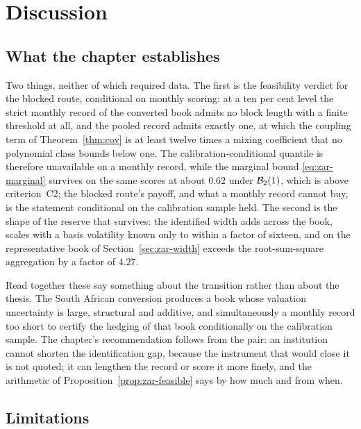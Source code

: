 \documentclass[../../../main.tex]{subfiles}
\begin{document}
\section{Discussion}\label{sec:zar-discussion}

\subsection{What the chapter establishes}

Two things, neither of which required data. The first is the feasibility verdict for the blocked route, conditional on monthly scoring: at a ten per cent level the strict monthly record of the converted book admits no block length with a finite threshold at all, and the pooled record admits exactly one, at which the coupling term of Theorem~\ref{thm:cov} is at least twelve times a mixing coefficient that no polynomial class bounds below one. The calibration-conditional quantile is therefore unavailable on a monthly record, while the marginal bound \eqref{eq:zar-marginal} survives on the same scores at about $0.62$ under $\mathcal B_{2}(1)$, which is above criterion~C2; the blocked route's payoff, and what a monthly record cannot buy, is the statement conditional on the calibration sample held. The second is the shape of the reserve that survives: the identified width adds across the book, scales with a basis volatility known only to within a factor of sixteen, and on the representative book of Section~\ref{sec:zar-width} exceeds the root-sum-square aggregation by a factor of $4.27$.

Read together these say something about the transition rather than about the thesis. The South African conversion produces a book whose valuation uncertainty is large, structural and additive, and simultaneously a monthly record too short to certify the hedging of that book conditionally on the calibration sample. The chapter's recommendation follows from the pair: an institution cannot shorten the identification gap, because the instrument that would close it is not quoted; it can lengthen the record or score it more finely, and the arithmetic of Proposition~\ref{prop:zar-feasible} says by how much and from when.

\subsection{Limitations}
\end{document}
